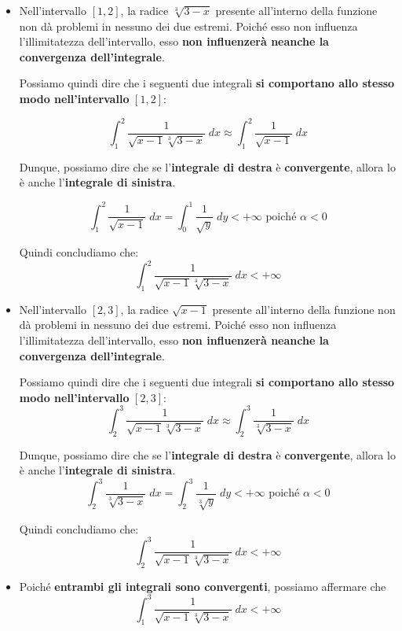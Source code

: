 \documentclass[a4paper, 12pt]{report}
\begin{document}
    \begin{itemize}
        \item Nell'intervallo $[1, 2]$, la radice $\sqrt[3]{3-x}$ presente all'interno della funzione non dà problemi in nessuno dei due estremi. Poiché esso non influenza l'illimitatezza dell'intervallo, esso \textbf{non influenzerà neanche la convergenza dell'integrale}.
        
        Possiamo quindi dire che i seguenti due integrali \textbf{si comportano allo stesso modo nell'intervallo} $[1, 2]$:
        
        \[ \int_{1}^{2} \frac{1}{\sqrt{x-1} \sqrt[3]{3-x}} \; dx \approx \int_{1}^{2} \frac{1}{\sqrt{x-1}} \; dx\]
        
        Dunque, possiamo dire che se l'\textbf{integrale di destra} è \textbf{convergente}, allora lo è anche l'\textbf{integrale di sinistra}.
        
        \[ \int_{1}^{2} \frac{1}{\sqrt{x-1}} \; dx = \int_{0}^{1} \frac{1}{\sqrt{y}} \; dy < +\infty \text{ poiché $\alpha < 0$}\]
        
        Quindi concludiamo che:
        \[ \int_{1}^{2} \frac{1}{\sqrt{x-1} \sqrt[3]{3-x}} \; dx < +\infty\]
        
        
        \item Nell'intervallo $[2, 3]$, la radice $\sqrt{x-1}$ presente all'interno della funzione non dà problemi in nessuno dei due estremi. Poiché esso non influenza l'illimitatezza dell'intervallo, esso \textbf{non influenzerà neanche la convergenza dell'integrale}.
        
        Possiamo quindi dire che i seguenti due integrali \textbf{si comportano allo stesso modo nell'intervallo} $[2, 3]$:
        \[ \int_{2}^{3} \frac{1}{\sqrt{x-1} \sqrt[3]{3-x}} \; dx \approx \int_{2}^{3} \frac{1}{\sqrt[3]{3-x}} \; dx\]
        
        Dunque, possiamo dire che se l'\textbf{integrale di destra} è \textbf{convergente}, allora lo è anche l'\textbf{integrale di sinistra}.
        \[ \int_{2}^{3} \frac{1}{\sqrt[3]{3-x}} \; dx = \int_{2}^{3} \frac{1}{\sqrt[3]{y}} \; dy < +\infty \text{ poiché $\alpha < 0$}\]
        
        Quindi concludiamo che:
        \[ \int_{2}^{3} \frac{1}{\sqrt{x-1} \sqrt[3]{3-x}} \; dx < +\infty\]
        
        \item Poiché \textbf{entrambi gli integrali sono convergenti}, possiamo affermare che
        \[ \int_{1}^{3} \frac{1}{\sqrt{x-1} \sqrt[3]{3-x}} \; dx < +\infty\]
        
    \end{itemize}
    
\end{document}
